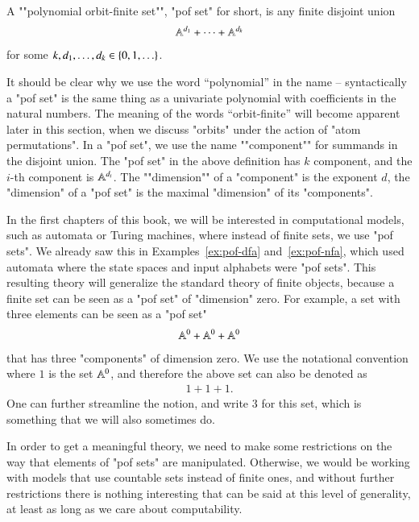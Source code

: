 \begin{definition}\label{def:pof-set}
    A ""polynomial orbit-finite set"", "pof set" for short, is any finite disjoint union 
    \begin{align*}
    \mathbb A^{d_1} + \cdots + \mathbb A^{d_k}
    \end{align*}
    for some $k,d_1,\ldots,d_k \in \{0,1,\ldots\}$. 
\end{definition}

It should be clear why we use the word ``polynomial'' in the name -- syntactically a "pof set" is the same thing as a univariate polynomial with coefficients in the natural numbers. The meaning of the words ``orbit-finite'' will become apparent later in this section, when we discuss "orbits" under the action of   "atom permutations". In a "pof set", we use the name ""component"" for summands in the disjoint union. The "pof set" in the above definition has $k$ component, and the $i$-th component is  $\mathbb A^{d_i}$. The ""dimension"" of a "component" is the exponent $d$, the "dimension" of a "pof set" is the maximal  "dimension" of its "components". 

In the first chapters of this book, we will be interested in computational models, such as automata or Turing machines, where instead of finite sets, we use "pof sets". We already saw this in Examples~\ref{ex:pof-dfa} and~\ref{ex:pof-nfa}, which used automata where the  state spaces and input alphabets were "pof sets". This resulting theory will generalize the standard theory of finite objects, because a finite set can be seen as a "pof set" of  "dimension" zero. For example, a set with three elements can be seen as a "pof set" 
\begin{align*}
\mathbb A^0 + \mathbb A^0 + \mathbb A^0
\end{align*}
that has three "components" of dimension zero. We use the notational convention where $1$ is the set $\mathbb A^0$, and therefore the above set can also be denoted as 
\begin{align*}
1 + 1 + 1.
\end{align*}
One can further streamline the notion, and write $3$ for this set, which is something that we will also sometimes do.

In order to get a meaningful theory,  we need to make some restrictions on the way that elements of "pof sets" are manipulated. Otherwise, we would be working with models that use countable sets instead of finite ones, and without further restrictions there is nothing interesting that can be said at this level of generality, at least as long as we care about computability. 


